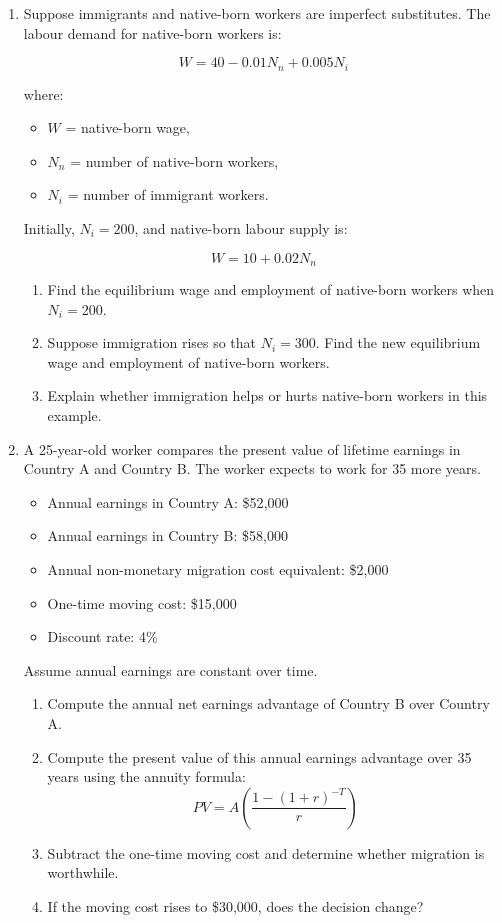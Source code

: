 \documentclass[12pt]{article}
\begin{document}
\begin{enumerate}[label=\textbf{Question \arabic*.}]
\item Suppose immigrants and native-born workers are imperfect substitutes. The labour demand for native-born workers is:

\[
W = 40 - 0.01N_n + 0.005N_i
\]

where:
\begin{itemize}
    \item \(W\) = native-born wage,
    \item \(N_n\) = number of native-born workers,
    \item \(N_i\) = number of immigrant workers.
\end{itemize}

Initially, \(N_i = 200\), and native-born labour supply is:

\[
W = 10 + 0.02N_n
\]

\begin{enumerate}[label=(\alph*)]
    \item Find the equilibrium wage and employment of native-born workers when \(N_i = 200\).
    \item Suppose immigration rises so that \(N_i = 300\). Find the new equilibrium wage and employment of native-born workers.
    \item Explain whether immigration helps or hurts native-born workers in this example.
\end{enumerate}

\item A 25-year-old worker compares the present value of lifetime earnings in Country A and Country B. The worker expects to work for 35 more years.

\begin{itemize}
    \item Annual earnings in Country A: \$52{,}000
    \item Annual earnings in Country B: \$58{,}000
    \item Annual non-monetary migration cost equivalent: \$2{,}000
    \item One-time moving cost: \$15{,}000
    \item Discount rate: 4\%
\end{itemize}

Assume annual earnings are constant over time.

\begin{enumerate}[label=(\alph*)]
    \item Compute the annual net earnings advantage of Country B over Country A.
    \item Compute the present value of this annual earnings advantage over 35 years using the annuity formula:
    \[
    PV = A\left(\frac{1-(1+r)^{-T}}{r}\right)
    \]
    \item Subtract the one-time moving cost and determine whether migration is worthwhile.
    \item If the moving cost rises to \$30{,}000, does the decision change?
\end{enumerate}


\end{enumerate}
\end{document}
